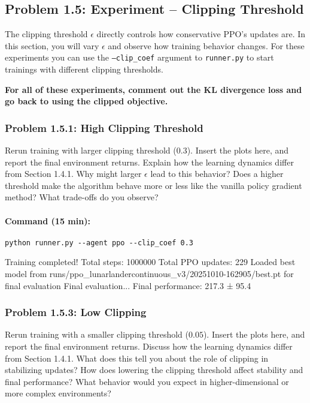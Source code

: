 \documentclass[12pt]{article}
\begin{document}
\begin{solution}[height=5cm]
\end{solution}

\clearpage
\newpage

\subsection*{Problem 1.5: Experiment – Clipping Threshold}

The clipping threshold $\epsilon$ directly controls how conservative PPO’s updates are. In this section, you will vary $\epsilon$ and observe how training behavior changes. For these experiments you can use the \texttt{--clip\_coef} argument to \texttt{runner.py} to start trainings with different clipping thresholds.

\textbf{For all of these experiments, comment out the KL divergence loss and go back to using the clipped objective.}

\subsubsection*{Problem 1.5.1: High Clipping Threshold}
Rerun training with larger clipping threshold (0.3). Insert the plots here, and report the final environment returns.  Explain how the learning dynamics differ from Section 1.4.1. Why might larger $\epsilon$ lead to this behavior? Does a higher threshold make the algorithm behave more or less like the vanilla policy gradient method? What trade-offs do you observe?

\paragraph{Command (15 min):}
\begin{verbatim}
python runner.py --agent ppo --clip_coef 0.3
\end{verbatim}


\begin{solution}[height=5cm]
Training completed! Total steps: 1000000
Total PPO updates: 229
Loaded best model from runs/ppo_lunarlandercontinuous_v3/20251010-162905/best.pt for final evaluation
Final evaluation...
Final performance: 217.3 ± 95.4

\end{solution}

\subsubsection*{Problem 1.5.3: Low Clipping}
Rerun training with a smaller clipping threshold ($0.05$). Insert the plots here, and report the final environment returns.  Discuss how the learning dynamics differ from Section 1.4.1. What does this tell you about the role of clipping in stabilizing updates? How does lowering the clipping threshold affect stability and final performance? What behavior would you expect in higher-dimensional or more complex environments?
\end{document}
